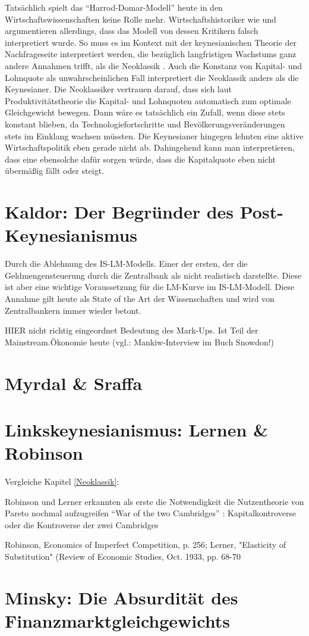 Tatsächlich spielt das "`Harrod-Domar-Modell"' heute in den Wirtschaftswissenschaften keine Rolle mehr. Wirtschaftshistoriker wie \textcite{Berg2013} und \textcite{Boianovsky2018} argumentieren allerdings, dass das Modell von dessen Kritikern falsch interpretiert wurde. So muss es im Kontext mit der keynesianischen Theorie der Nachfrageseite interpretiert werden, die bezüglich langfristigen Wachstums ganz andere Annahmen trifft, als die Neoklassik \parencite[S. 479]{Boianovsky2018}. Auch die Konstanz von Kapital- und Lohnquote als unwahrscheinlichen Fall interpretiert die Neoklassik anders als die Keynesianer. Die Neoklassiker vertrauen darauf, dass sich laut Produktivitätstheorie die Kapital- und Lohnquoten automatisch zum optimale Gleichgewicht bewegen. Dann wäre es tatsächlich ein Zufall, wenn diese stets konstant blieben, da Technologiefortschritte und Bevölkerungsveränderungen stets im Einklang wachsen müssten. Die Keynesianer hingegen lehnten eine aktive Wirtschaftspolitik eben gerade nicht ab. Dahingehend kann man interpretieren, dass eine ebensolche dafür sorgen würde, dass die Kapitalquote eben nicht übermäßig fällt oder steigt.



\section{Kaldor: Der Begründer des Post-Keynesianismus}
Durch die Ablehnung des IS-LM-Modells.
Einer der ersten, der die Geldmengensteuerung durch die Zentralbank als nicht realistisch darstellte. Diese ist aber eine wichtige Voraussetzung für die LM-Kurve im IS-LM-Modell. Diese Annahme gilt heute als State of the Art der Wissenschaften und wird von Zentralbankern immer wieder betont.

HIER nicht richtig eingeordnet
Bedeutung des Mark-Ups. Ist Teil der Mainstream.Ökonomie heute (vgl.: Mankiw-Interview im Buch Snowdon!)


\section{Myrdal \& Sraffa}

\section{Linkskeynesianismus: Lernen \& Robinson}

Vergleiche Kapitel \ref{Neoklassik}:

Robinson und Lerner erkannten als erste die Notwendigkeit die Nutzentheorie von Pareto nochmal aufzugreifen
"`War of the two Cambridges"' \parencite{Tobin1985}: Kapitalkontroverse oder die Kontroverse der zwei Cambridges

Robinson, Economics of Imperfect Competition, p. 256; Lerner, "Elasticity of Substitution" (Review of Economic Studies, Oct. 1933, pp. 68-70

\section{Minsky: Die Absurdität des Finanzmarktgleichgewichts}





